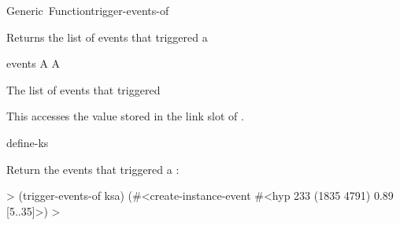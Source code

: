 \documentclass[10pt,twoside,english,pdftex]{article}
\begin{document}
\begin{functiondoc}{Generic~Function}{trigger-events-of}{ 
    \returns{} }
%
%

\fnsyntax

\fnpurpose Returns the list of events that triggered a 

\fnmethods
{}

\fnpackage {}

\fnmodule {}

\fnargs
\begin{args}{events}
\arg[ksa] A 
\arg[events] A 
\end{args}

\fnreturns The list of events that triggered 
  
\fndescription 
This  accesses the value stored in the
 link slot of .

\begin{alsos}{define-ks}
\also[define-ks]
\also[ks]
\also[ksa]
\end{alsos}

\fnexample
Return the events that triggered a :
%
\W\supp
\begin{example}
  > (trigger-events-of ksa)
  (#<create-instance-event #<hyp 233 (1835 4791) 0.89 [5..35]>)
  >
\end{example}

\end{functiondoc}

\end{document}

